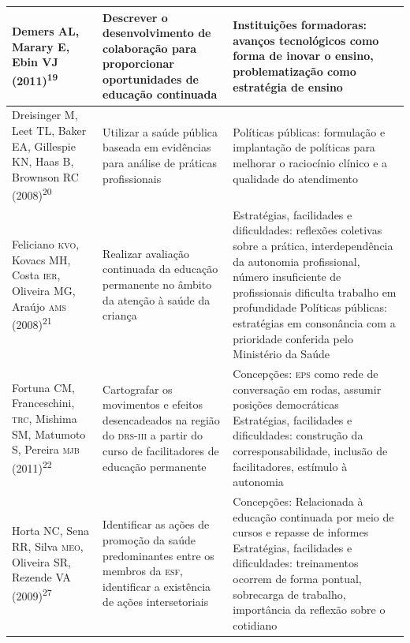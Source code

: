 \documentclass{article}
\begin{document}
\begin{table}
\begin{xtabular}{ l | l | l }
Demers AL, Marary E, Ebin VJ (2011)\textsuperscript{19}

& Descrever o desenvolvimento de colaboração para proporcionar oportunidades de
educação continuada
& Instituições formadoras: avanços tecnológicos como forma de inovar o ensino,
problematização como estratégia de ensino
\\ \hline

Dreisinger M, Leet TL, Baker EA, Gillespie KN, Haas B, Brownson RC (2008)\textsuperscript{20}

& Utilizar a saúde pública baseada em evidências para análise de práticas
profissionais
& Políticas públicas: formulação e implantação de políticas para melhorar o
raciocínio clínico e a qualidade do atendimento
\\ \hline

Feliciano \textsc{kvo}, Kovacs MH, Costa \textsc{ier}, Oliveira MG, Araújo \textsc{ams} (2008)\textsuperscript{21}

& Realizar avaliação continuada da educação permanente no âmbito da atenção à
saúde da criança
& Estratégias, facilidades e dificuldades: reflexões coletivas sobre a prática,
interdependência da autonomia profissional, número insuficiente de profissionais
dificulta trabalho em profundidade Políticas públicas: estratégias em
consonância com a prioridade conferida pelo Ministério da Saúde
\\ \hline

Fortuna CM, Franceschini, \textsc{trc}, Mishima SM, Matumoto S, Pereira \textsc{mjb} (2011)\textsuperscript{22}

& Cartografar os movimentos e efeitos desencadeados na região do \textsc{drs}-\textsc{iii} a
partir do curso de facilitadores de educação permanente
& Concepções: \textsc{eps} como rede de conversação em rodas, assumir posições
democráticas Estratégias, facilidades e dificuldades: construção da
corresponsabilidade, inclusão de facilitadores, estímulo à autonomia
\\ \hline

Horta NC, Sena RR, Silva \textsc{meo}, Oliveira SR, Rezende VA (2009)\textsuperscript{27}

& Identificar as ações de promoção da saúde predominantes entre os membros da
\textsc{esf}, identificar a existência de ações intersetoriais
& Concepções: Relacionada à educação continuada por meio de cursos e repasse de
informes Estratégias, facilidades e dificuldades: treinamentos ocorrem de forma
pontual, sobrecarga de trabalho, importância da reflexão sobre o cotidiano
\\ \hline


\end{xtabular}
\end{table}
\end{document}
